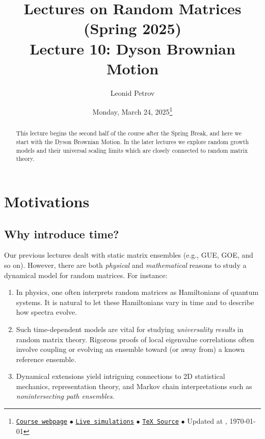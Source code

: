 \documentclass[letterpaper,11pt,oneside,reqno]{article}
\numberwithin{equation}{section}
\theoremstyle{definition}
\begin{document}
\title{Lectures on Random Matrices
(Spring 2025)
\\Lecture 10: Dyson Brownian Motion}


\date{Monday, March 24, 2025\footnote{\href{https://lpetrov.cc/rmt25/}{\texttt{Course webpage}}
$\bullet$ \href{https://lpetrov.cc/simulations/model/random-matrices/}{\texttt{Live simulations}}
$\bullet$ \href{https://lpetrov.cc/rmt25/rmt25-notes/rmt2025-l10.tex}{\texttt{TeX Source}}
$\bullet$
Updated at \currenttime, \today}}



\author{Leonid Petrov}


\maketitle

\begin{abstract}
	This lecture begins the second half of the course after the Spring Break, and
	here we start with the Dyson Brownian Motion.
	In the later lectures we explore random growth models and their universal scaling limits
	which are closely connected to random matrix theory.
\end{abstract}

\section{Motivations}
\subsection{Why introduce time?}
Our previous lectures dealt with static matrix ensembles (e.g., GUE, GOE, and so on). However, there are both \emph{physical} and \emph{mathematical} reasons to study a dynamical model for random matrices. For instance:
\begin{enumerate}
\item In physics, one often interprets random matrices as Hamiltonians of quantum systems. It is natural to let these Hamiltonians vary in time and to describe how spectra evolve.
\item Such time-dependent models are vital for studying \emph{universality results} in random matrix theory. Rigorous proofs of local eigenvalue correlations often involve coupling or evolving an ensemble toward (or away from) a known reference ensemble.
\item Dynamical extensions yield intriguing connections to 2D statistical mechanics, representation theory, and Markov chain interpretations such as \emph{nonintersecting path ensembles}.
\end{enumerate}
\end{document}
